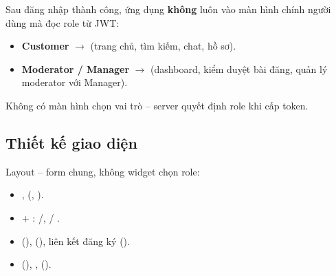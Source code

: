 Sau đăng nhập thành công, ứng dụng \textbf{không} luôn vào màn hình chính
người dùng mà đọc role từ JWT:
\begin{itemize}
    \item \textbf{Customer} $\rightarrow$  (trang chủ,
    tìm kiếm, chat, hồ sơ).
    \item \textbf{Moderator / Manager} $\rightarrow$ 
    (dashboard, kiểm duyệt bài đăng, quản lý moderator với Manager).
\end{itemize}

Không có màn hình chọn vai trò -- server quyết định role khi cấp token.

\subsection{Thiết kế giao diện}
Layout  -- form chung, không widget chọn role:
\begin{itemize}
    \item {},  (, ).
    \item {} + :
    /, /
    .
    \item {} (),
      (),
    liên kết đăng ký ().
    \item {} (), ,
     ().
\end{itemize}


